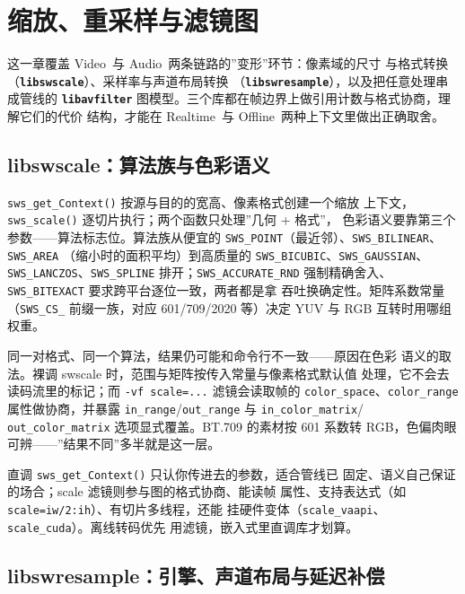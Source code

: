 \documentclass[12pt,a4paper,fontset=fandol]{ctexbook}
\newcommand{\Fn}[1]{\texttt{#1()}}
\newcommand{\Tp}[1]{\texttt{#1}}
\newcommand{\Bk}{\discretionary{}{}{}}
\newcommand{\Lib}[1]{\textbf{\texttt{#1}}}
\newcommand{\Lang}[1]{\textsf{#1}}
\newcommand{\DomAud}{\Lang{Audio}}
\newcommand{\DomVid}{\Lang{Video}}
\newcommand{\DomRT}{\Lang{Realtime}}
\newcommand{\DomBatch}{\Lang{Offline}}
\begin{document}
\chapter{缩放、重采样与滤镜图}
\label{ch:ch09-filter-resample}

这一章覆盖 \DomVid\ 与 \DomAud\ 两条链路的''变形''环节：像素域的尺寸
与格式转换（\Lib{libswscale}）、采样率与声道布局转换
（\Lib{libswresample}），以及把任意处理串成管线的 \Lib{libavfilter}
图模型。三个库都在帧边界上做引用计数与格式协商，理解它们的代价
结构，才能在 \DomRT\ 与 \DomBatch\ 两种上下文里做出正确取舍。

\section{libswscale：算法族与色彩语义}

\Fn{sws\_get\Bk\_Context} 按源与目的的宽高、像素格式创建一个缩放
上下文，\Fn{sws\_scale} 逐切片执行；两个函数只处理''几何 + 格式''，
色彩语义要靠第三个参数——算法标志位。算法族从便宜的
\Tp{SWS\_POINT}（最近邻）、\Tp{SWS\_BILINEAR}、\Tp{SWS\_AREA}
（缩小时的面积平均）到高质量的 \Tp{SWS\_BICUBIC}、\Tp{SWS\_GAUSSIAN}、
\Tp{SWS\_LANCZOS}、\Tp{SWS\_SPLINE} 排开；\Tp{SWS\_ACCURATE\_RND}
强制精确舍入、\Tp{SWS\_BITEXACT} 要求跨平台逐位一致，两者都是拿
吞吐换确定性。矩阵系数常量（\Tp{SWS\_CS\_} 前缀一族，对应 601/709/2020
等）决定 YUV 与 RGB 互转时用哪组权重。

同一对格式、同一个算法，结果仍可能和命令行不一致——原因在色彩
语义的取法。裸调 swscale 时，范围与矩阵按传入常量与像素格式默认值
处理，它不会去读码流里的标记；而 \Tp{-vf scale=...} 滤镜会读取帧的
\Tp{color\_space}、\Tp{color\_range} 属性做协商，并暴露
\Tp{in\_range}/{\Bk}\Tp{out\_range} 与 \Tp{in\_color\_matrix}/
\Tp{out\_color\_matrix} 选项显式覆盖。BT.709 的素材按 601 系数转
RGB，色偏肉眼可辨——''结果不同''多半就是这一层。

\begin{compare}[title={scale 滤镜与直调 sws 的差别}]
  直调 \Fn{sws\_get\Bk\_Context} 只认你传进去的参数，适合管线已
  固定、语义自己保证的场合；scale 滤镜则参与图的格式协商、能读帧
  属性、支持表达式（如 \Tp{scale=iw/2:ih}）、有切片多线程，还能
  挂硬件变体（\Tp{scale\_vaapi}、\Tp{scale\_cuda}）。离线转码优先
  用滤镜，嵌入式里直调库才划算。
\end{compare}

\section{libswresample：引擎、声道布局与延迟补偿}
\end{document}
